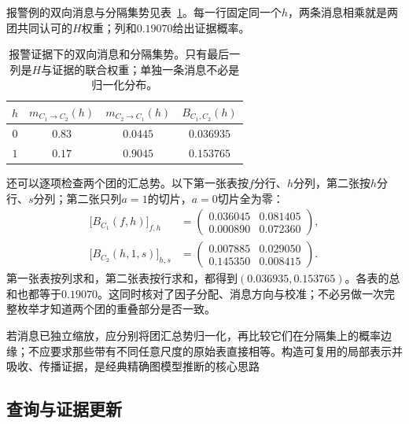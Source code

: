 报警例的双向消息与分隔集势见表~\ref{tab:pgm-junction-tree-calibrated-separator}。每一行固定同一个$h$，两条消息相乘就是两团共同认可的$H$权重；列和$0.19070$给出证据概率。

\begin{table}[htbp]
  \centering
  \begin{tabular}{cccc}
    \toprule
    $h$ & $m_{C_1\to C_2}(h)$ & $m_{C_2\to C_1}(h)$ & $B_{C_1,C_2}(h)$\\
    \midrule
    $0$ & $0.83$ & $0.0445$ & $0.036935$\\
    $1$ & $0.17$ & $0.9045$ & $0.153765$\\
    \bottomrule
  \end{tabular}
  \caption{报警证据下的双向消息和分隔集势。只有最后一列是$H$与证据的联合权重；单独一条消息不必是归一化分布。}
  \label{tab:pgm-junction-tree-calibrated-separator}
\end{table}

还可以逐项检查两个团的汇总势。以下第一张表按$f$分行、$h$分列，第二张按$h$分行、$s$分列；第二张只列$a=1$的切片，$a=0$切片全为零：
\begin{equation}
  \begin{aligned}
    \bigl[B_{C_1}(f,h)\bigr]_{f,h}
      &=\begin{pmatrix}
          0.036045&0.081405\\
          0.000890&0.072360
        \end{pmatrix},\\
    \bigl[B_{C_2}(h,1,s)\bigr]_{h,s}
      &=\begin{pmatrix}
          0.007885&0.029050\\
          0.145350&0.008415
        \end{pmatrix}.
  \end{aligned}
  \label{eq:pgm-junction-tree-device-calibrated-tables}
\end{equation}
第一张表按列求和，第二张表按行求和，都得到$(0.036935,0.153765)$。各表的总和也都等于$0.19070$。这同时核对了因子分配、消息方向与校准；不必另做一次完整枚举才知道两个团的重叠部分是否一致。

若消息已独立缩放，应分别将团汇总势归一化，再比较它们在分隔集上的概率边缘；不应要求那些带有不同任意尺度的原始表直接相等。构造可复用的局部表示并吸收、传播证据，是经典精确图模型推断的核心思路

\subsection{查询与证据更新}
\label{sec:pgm-junction-tree-queries-updates}

